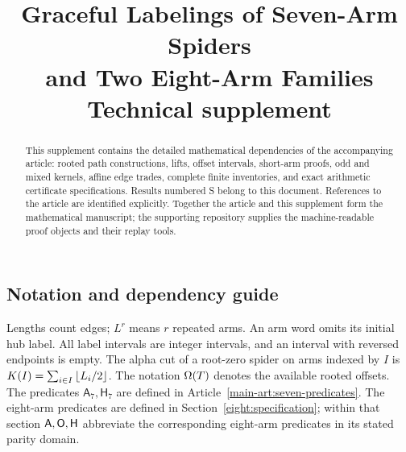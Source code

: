 
\newif\ifSevenVolume\SevenVolumetrue
\makeatletter
\renewcommand{\@pnumwidth}{2.3em}
\renewcommand{\@tocrmarg}{3em}
\renewcommand*\l@section[2]{\addvspace{0.4em}\@dottedtocline{1}{0em}{2.5em}{\bfseries #1}{\bfseries #2}}
\renewcommand*\l@subsection{\@dottedtocline{2}{2.5em}{4em}}
\makeatother
\renewcommand{\thesection}{S\arabic{section}}

\title{Graceful Labelings of Seven-Arm Spiders\\and Two Eight-Arm Families\\[6pt]\large Technical supplement}

\date{}

\maketitle
\begin{abstract}
This supplement contains the detailed mathematical dependencies of
the accompanying article: rooted path constructions, lifts, offset
intervals, short-arm proofs, odd and mixed kernels, affine edge
trades, complete finite inventories, and exact arithmetic certificate
specifications. Results numbered S belong to this document. References
to the article are identified explicitly. Together the article and this supplement form the mathematical
manuscript; the supporting repository supplies the machine-readable
proof objects and their replay tools.
\end{abstract}

\subsection*{Notation and dependency guide}
Lengths count edges; $L^r$ means $r$ repeated arms. An arm word omits
its initial hub label. All label intervals are integer intervals,
and an interval with reversed endpoints is empty. The alpha cut of
a root-zero spider on arms indexed by $I$ is
$K(I)=\sum_{i\in I}\left\lfloor L_i/2\right\rfloor$. The notation $\Omega(T)$ denotes
the available rooted offsets. The predicates $\mathsf A_7,\mathsf H_7$
are defined in Article~\ref*{main-art:seven-predicates}. The eight-arm
predicates are defined in Section~\ref{eight:specification}; within
that section $\mathsf A,\mathsf O,\mathsf H$ abbreviate the corresponding
eight-arm predicates in its stated parity domain.

